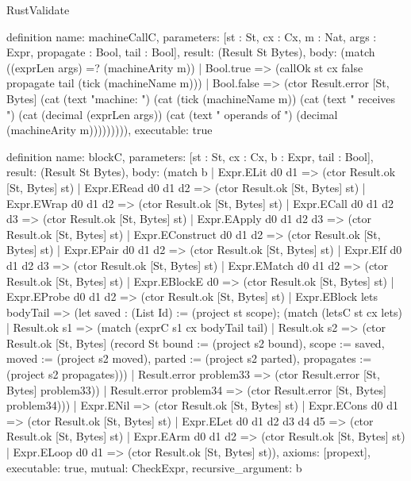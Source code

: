 \begin{lexlean}{RustValidate}
\begin{semanticmodule}
definition{
  name: machineCallC,
  parameters: [st : St, cx : Cx, m : Nat, args : Expr, propagate : Bool, tail : Bool],
  result: (Result St Bytes),
  body: (match ((exprLen args) =? (machineArity m))
    | Bool.true => (callOk st cx false propagate tail (tick (machineName m)))
    | Bool.false => (ctor Result.error [St, Bytes] (cat (text "machine: ") (cat (tick (machineName m)) (cat (text " receives ") (cat (decimal (exprLen args)) (cat (text " operands of ") (decimal (machineArity m))))))))),
  executable: true
}

definition{
  name: blockC,
  parameters: [st : St, cx : Cx, b : Expr, tail : Bool],
  result: (Result St Bytes),
  body: (match b
    | Expr.ELit d0 d1 => (ctor Result.ok [St, Bytes] st)
    | Expr.ERead d0 d1 d2 => (ctor Result.ok [St, Bytes] st)
    | Expr.EWrap d0 d1 d2 => (ctor Result.ok [St, Bytes] st)
    | Expr.ECall d0 d1 d2 d3 => (ctor Result.ok [St, Bytes] st)
    | Expr.EApply d0 d1 d2 d3 => (ctor Result.ok [St, Bytes] st)
    | Expr.EConstruct d0 d1 d2 => (ctor Result.ok [St, Bytes] st)
    | Expr.EPair d0 d1 d2 => (ctor Result.ok [St, Bytes] st)
    | Expr.EIf d0 d1 d2 d3 => (ctor Result.ok [St, Bytes] st)
    | Expr.EMatch d0 d1 d2 => (ctor Result.ok [St, Bytes] st)
    | Expr.EBlockE d0 => (ctor Result.ok [St, Bytes] st)
    | Expr.EProbe d0 d1 d2 => (ctor Result.ok [St, Bytes] st)
    | Expr.EBlock lets bodyTail => (let saved : (List Id) := (project st scope); (match (letsC st cx lets)
      | Result.ok s1 => (match (exprC s1 cx bodyTail tail)
        | Result.ok s2 => (ctor Result.ok [St, Bytes] (record St {bound := (project s2 bound), scope := saved, moved := (project s2 moved), parted := (project s2 parted), propagates := (project s2 propagates)}))
        | Result.error problem33 => (ctor Result.error [St, Bytes] problem33))
      | Result.error problem34 => (ctor Result.error [St, Bytes] problem34)))
    | Expr.ENil => (ctor Result.ok [St, Bytes] st)
    | Expr.ECons d0 d1 => (ctor Result.ok [St, Bytes] st)
    | Expr.ELet d0 d1 d2 d3 d4 d5 => (ctor Result.ok [St, Bytes] st)
    | Expr.EArm d0 d1 d2 => (ctor Result.ok [St, Bytes] st)
    | Expr.ELoop d0 d1 => (ctor Result.ok [St, Bytes] st)),
  axioms: [propext],
  executable: true,
  mutual: CheckExpr,
  recursive_argument: b
}


\end{semanticmodule}
\end{lexlean}
